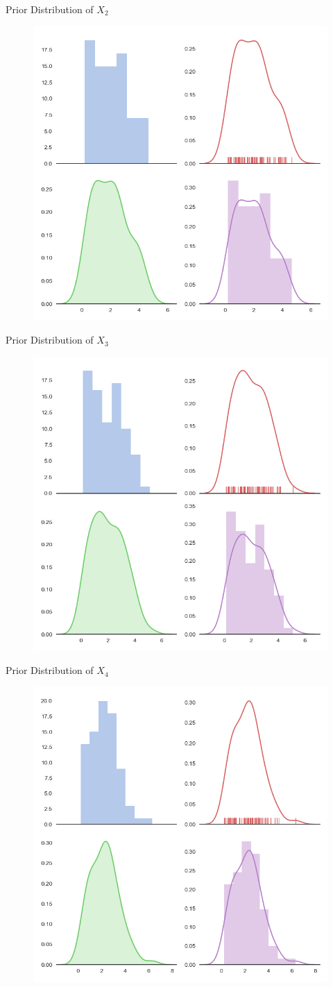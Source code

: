 \documentclass[12pt]{beamer}
\begin{document}
\begin{frame}{Prior Distribution of \(X_2\)}
	\begin{figure}[!ht]
		\centering
		\includegraphics[width=0.5\columnwidth,height=0.5\linewidth]{fig/10_2.png}
	\end{figure}
\end{frame}	

\begin{frame}{Prior Distribution of \(X_3\)}
	\begin{figure}[!ht]
		\centering
		\includegraphics[width=0.5\columnwidth,height=0.5\linewidth]{fig/10_3.png}
	\end{figure}
\end{frame}

\begin{frame}{Prior Distribution of \(X_4\)}
	\begin{figure}[!ht]
		\centering
		\includegraphics[width=0.5\columnwidth,height=0.5\linewidth]{fig/10_4.png}
	\end{figure}
\end{frame}
\end{document}
